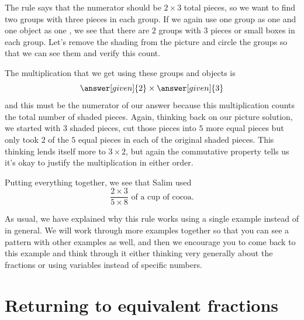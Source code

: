 \documentclass{ximera}
\begin{document}
\begin{example}
The rule says that the numerator should be $2 \times 3$ total pieces, so we want to find two groups with three pieces in each group. If we again use one group as one  and one object as one , we see that there are $2$ groups with $3$ pieces or small boxes in each group. Let's remove the shading from the picture and circle the groups so that we can see them and verify this count.
\begin{image}
\end{image}
The multiplication that we get using these groups and objects is 
\[
\answer[given]{2} \times \answer[given]{3}
\]
and this must be the numerator of our answer because this multiplication counts the total number of shaded pieces. Again, thinking back on our picture solution, we started with $3$ shaded pieces, cut those pieces into $5$ more equal pieces but only took $2$ of the $5$ equal pieces in each of the original shaded pieces. This thinking lends itself more to $3 \times 2$, but again the commutative property tells us it's okay to justify the multiplication in either order. 

Putting everything together, we see that Salim used
\[
\frac{2 \times 3}{5 \times 8} \textrm{ of a cup of cocoa.}
\]

\end{example}

As usual, we have explained why this rule works using a single example instead of in general. We will work through more examples together so that you can see a pattern with other examples as well, and then we encourage you to come back to this example and think through it either thinking very generally about the fractions or using variables instead of specific numbers. 



\section{Returning to equivalent fractions}
\end{document}
